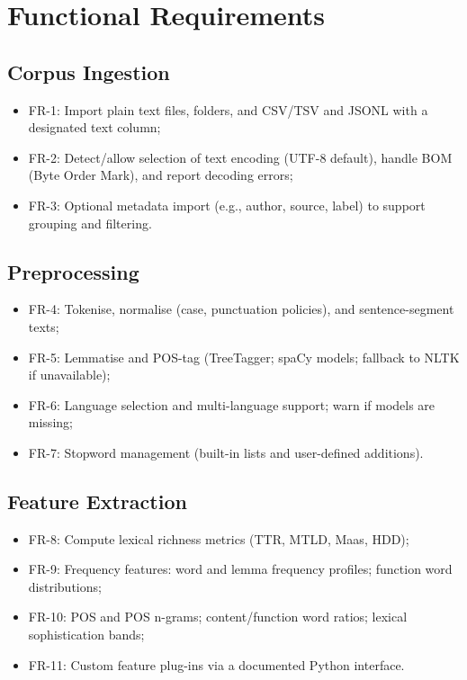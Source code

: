 \section{Functional Requirements}
\subsection{Corpus Ingestion}
\begin{itemize}
    \item FR-1: Import plain text files, folders, and CSV/TSV and JSONL with a designated text column;
    \item FR-2: Detect/allow selection of text encoding (UTF-8 default), handle BOM (Byte Order Mark), and report decoding errors;
    \item FR-3: Optional metadata import (e.g., author, source, label) to support grouping and filtering.
\end{itemize}

\subsection{Preprocessing}
\begin{itemize}
    \item FR-4: Tokenise, normalise (case, punctuation policies), and sentence-segment texts;
    \item FR-5: Lemmatise and POS-tag (TreeTagger; spaCy models; fallback to NLTK if unavailable);
    \item FR-6: Language selection and multi-language support; warn if models are missing;
    \item FR-7: Stopword management (built-in lists and user-defined additions).
\end{itemize}

\subsection{Feature Extraction}
\begin{itemize}
    \item FR-8: Compute lexical richness metrics (TTR, MTLD, Maas, HDD);
    \item FR-9: Frequency features: word and lemma frequency profiles; function word distributions;
    \item FR-10: POS and POS n-grams; content/function word ratios; lexical sophistication bands;
    \item FR-11: Custom feature plug-ins via a documented Python interface.
\end{itemize}


